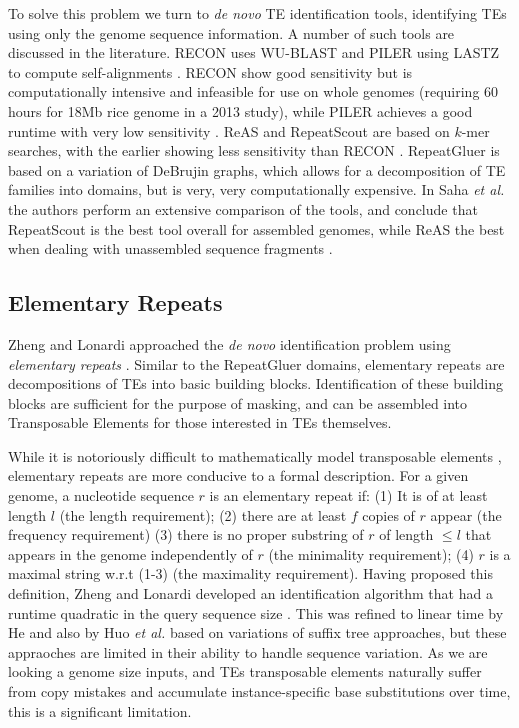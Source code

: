 \documentclass[11pt]{article}
\begin{document}
To solve this problem we turn to {\it de novo} TE identification
tools, identifying TEs using only the genome sequence information.  A
number of such tools are discussed in the literature.  RECON uses
WU-BLAST and PILER using LASTZ to compute self-alignments
\cite{Bao:2002,Edgar:2005p2365,Lopez:2003td,Harris:2007uf}.  RECON
show good sensitivity but is computationally intensive and infeasible
for use on whole genomes (requiring 60 hours for 18Mb rice genome in a
2013 study), while PILER achieves a good runtime with very low
sensitivity .  ReAS and RepeatScout \cite{Price:2005p1247} are based
on $k$-mer searches, with the earlier showing less sensitivity than
RECON \cite{Li:2005he, Price:2005p1247,Jiang:2013jt}.  RepeatGluer
\cite{Pevzner:2004p3157,Zhi:2006p3199} is based on a variation of
DeBrujin graphs, which allows for a decomposition of TE families into
domains, but is very, very computationally expensive.  In Saha {\it et
  al.} the authors perform an extensive comparison of the tools, and
conclude that RepeatScout is the best tool overall for assembled
genomes, while ReAS the best when dealing with unassembled sequence
fragments \cite{Saha:2008dm}.


\subsection*{Elementary Repeats}
Zheng and Lonardi approached the {\it de novo} identification problem using {\it elementary repeats}
\cite{Zheng:2005bl}.
Similar to the RepeatGluer domains, elementary repeats are
decompositions of TEs into basic building blocks.  Identification of
these building blocks are sufficient for the purpose
of masking, and can be assembled into Transposable Elements for those
interested in TEs themselves.

While it is notoriously difficult to mathematically model transposable
elements \cite{Bao:2002}, elementary repeats are more conducive to a
formal description.  For a given genome, a nucleotide sequence $r$ is
an elementary repeat if: (1) It is of at least length $l$ (the length
requirement); (2) there are at least $f$ copies of $r$ appear (the
frequency requirement) (3) there is no proper substring of $r$ of
length $\leq l$ that appears in the genome independently of $r$ (the
minimality requirement); (4) $r$ is a maximal string w.r.t (1-3) (the
maximality requirement).  Having proposed this definition, Zheng and
Lonardi developed an identification algorithm that had a runtime
quadratic in the query sequence size \cite{Zheng:2005bl}. This was
refined to linear time by He and also by Huo {\it et al.}
\cite{He:2006gpa,Huo:2009hoa} based on variations of suffix tree
approaches, but these appraoches are limited in their ability to handle sequence
variation.  As we are looking a genome size inputs, and TEs
transposable elements naturally suffer from copy mistakes and
accumulate instance-specific base substitutions over time, this is a
significant limitation.
\end{document}
